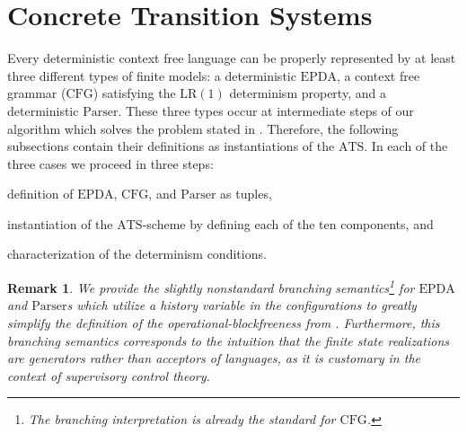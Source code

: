 \documentclass[draft]{ifacconf}
\newtheorem{remark}{Remark}
\newcommand{\ATS}{\ensuremath{\mathrm{ATS}}\xspace}
\newcommand{\Parser}{\ensuremath{\mathrm{Parser}}\xspace}
\newcommand{\CFG}{\ensuremath{\mathrm{CFG}}\xspace}
\newcommand{\LR}[1][1]{\ensuremath{\mathrm{LR}(#1)}\xspace}
\newcommand{\EPDA}{\ensuremath{\mathrm{EPDA}}\xspace}
\begin{document}
\section{Concrete Transition Systems}\label{sect:CTS}
Every deterministic context free language can be properly represented by at least three different types of finite models: a deterministic \EPDA, a context free grammar (\CFG) satisfying the \LR determinism property, and a deterministic \Parser.
These three types occur at intermediate steps of our algorithm which solves the problem stated in .
Therefore, the following subsections contain their definitions as instantiations of the \ATS.
In each of the three cases we proceed in three steps:
\begin{inparaenum}
\item definition of \EPDA, \CFG, and \Parser as tuples,
\item instantiation of the \ATS-scheme by defining each of the ten components, and
\item characterization of the determinism conditions.
\end{inparaenum}

\begin{remark}
We provide the slightly nonstandard branching semantics\footnote{The branching interpretation is already the standard for \CFG.} for \EPDA and \Parser{}s which utilize a history variable in the configurations to greatly simplify the definition of the operational-blockfreeness from .
Furthermore, this branching semantics corresponds to the intuition that the finite state realizations are generators rather than acceptors of languages, as it is customary in the context of supervisory control theory.

\end{remark}
\newrobustcmd{\ENDOFSTACK}{\ensuremath{\Box}\xspace}
\end{document}
